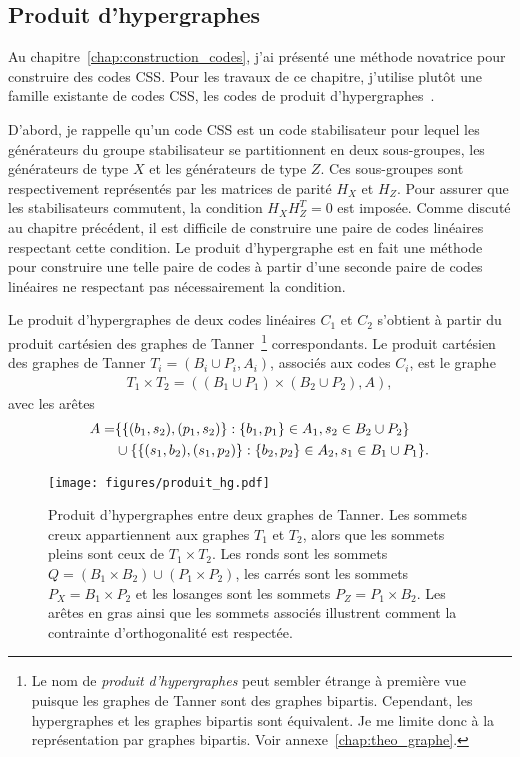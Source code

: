 \subsection{Produit d'hypergraphes}

Au chapitre~\ref{chap:construction_codes},
j'ai présenté une méthode novatrice pour construire des codes CSS.
Pour les travaux de ce chapitre,
j'utilise plutôt une famille existante de codes CSS,
les codes de produit d'hypergraphes~\cite{tillich_quantum_2014}.

D'abord,
je rappelle qu'un code CSS est un code stabilisateur pour lequel les générateurs du groupe
stabilisateur se partitionnent en deux sous-groupes, 
les générateurs de type $X$ et les générateurs de type $Z$.
Ces sous-groupes sont respectivement représentés par les matrices de parité $H_X$ et $H_Z$.
Pour assurer que les stabilisateurs commutent,
la condition $H_X H_Z^T = 0$ est imposée.
Comme discuté au chapitre précédent,
il est difficile de construire une paire de codes linéaires
respectant cette condition.
Le produit d'hypergraphe est en fait une méthode pour construire
une telle paire de codes à partir d'une seconde paire de codes linéaires
ne respectant pas nécessairement la condition.

Le produit d'hypergraphes de deux codes linéaires $C_1$ et $C_2$
s'obtient à partir du produit cartésien des graphes de 
Tanner~\footnote{Le nom de \textit{produit d'hypergraphes} peut sembler étrange à première
vue puisque les graphes de Tanner sont des graphes bipartis. Cependant, les hypergraphes et les graphes
bipartis sont équivalent. Je me limite donc à la représentation par graphes bipartis.
Voir annexe~\ref{chap:theo_graphe}.} correspondants.
Le produit cartésien des graphes de Tanner $T_i = (B_i \cup P_i, A_i)$,
associés aux codes $C_i$, 
est le graphe 
\begin{align}
	T_1 \times T_2 = ((B_1 \cup P_1) \times (B_2 \cup P_2), A),
\end{align}
avec les arêtes 
\begin{align}
	A = 
	&\qty{
		\qty{(b_1, s_2), (p_1, s_2)} :
		\qty{b_1, p_1} \in A_1, s_2 \in B_2 \cup P_2
	} 
	\notag\\
	&\cup
	\qty{
		\qty{(s_1, b_2), (s_1, p_2)} :
		\qty{b_2, p_2} \in A_2, s_1 \in B_1 \cup P_1
	}.
\end{align}

\begin{figure}
	\centering
	\texttt{[image: figures/produit\_hg.pdf]}
	\caption[Produit d'hypergraphes]{
		Produit d'hypergraphes entre deux graphes de Tanner.
		Les sommets creux appartiennent aux graphes $T_1$ et $T_2$,
		alors que les sommets pleins sont ceux de $T_1 \times T_2$.
		Les ronds sont les sommets $Q = (B_1 \times B_2) \cup (P_1 \times P_2)$,
		les carrés sont les sommets $P_X = B_1 \times P_2$
		et les losanges sont les sommets $P_Z = P_1 \times B_2$.
		Les arêtes en gras ainsi que les sommets associés illustrent comment
		la contrainte d'orthogonalité est respectée.
	}
	\label{fig:produit_hg}
\end{figure}


